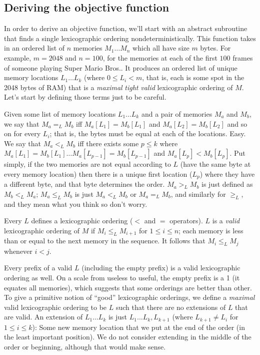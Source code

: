 \documentclass[twocolumn]{article}
\begin{document}
\subsection{Deriving the objective function} \label{sec:deriving}

In order to derive an objective function, we'll start with an abstract
subroutine that finds a single lexicographic ordering
nondeterministically. This function takes in an ordered list of $n$
memories $M_1\ldots M_n$ which all have size $m$ bytes. For example,
$m = 2048$ and $n = 100$, for the memories at each of the first $100$
frames of someone playing Super Mario Bros.. It produces an ordered
list of unique memory locations $L_1 \ldots L_k$ (where $0 \leq L_i <
m$, that is, each is some spot in the 2048 bytes of RAM) that is a
{\em maximal} {\em tight} {\em valid} lexicographic ordering of $M$.
Let's start by defining those terms just to be careful.

Given some list of memory locations $L_1 \ldots L_k$ and a pair of
memories $M_a$ and $M_b$, we say that $M_a =_L M_b$ iff $M_a[L_1] =
M_b[L_1]$ and $M_a[L_2] = M_b[L_2]$ and so on for every $L_i$; that
is, the bytes must be equal at each of the locations. Easy. We say
that $M_a <_L M_b$ iff there exists some $p \leq k$ where $M_a[L_1] =
M_b[L_1] \ldots M_a[L_{p-1}] = M_b[L_{p-1}]$ and $M_a[L_p] <
M_b[L_p]$. Put simply, if the two memories are not equal according to
$L$ (have the same byte at every memory location) then there is a
unique first location ($L_p$) where they have a different byte, and
that byte determines the order. $M_a >_L M_b$ is just defined as $M_b <_L
M_a$; $M_a \leq_L M_b$ is just $M_a <_L M_b$ or $M_a =_L M_b$, and similarly
for $\geq_L$, and they mean what you think so don't worry.

Every $L$ defines a lexicographic ordering ($<$ and $=$ operators).
$L$ is a {\em valid} lexicographic ordering of $M$ if $M_i \leq_L M_{i + 1}$
for $1 \leq i \leq n$; each memory is less than or equal to the next
memory in the sequence. It follows that $M_i \leq_L M_j$ whenever $i < j$.

Every prefix of a valid $L$ (including the empty prefix) is a valid
lexicographic ordering as well. On a scale from useless to useful, the
empty prefix is a 1 (it equates all memories), which suggests that
some orderings are better than other. To give a primitive notion of
``good'' lexicographic orderings, we define a {\em maximal} valid
lexicographic ordering to be $L$ such that there are no extensions of
$L$ that are valid. An extension of $L_1 \ldots L_k$ is just $L_1
\ldots L_k, L_{k+1}$ (where $L_{k+1} \neq L_i$ for $1 \leq i \leq k$):
Some new memory location that we put at the end of the order (in the
least important position). We do not consider extending in the middle
of the order or beginning, although that would make sense.
\end{document}

